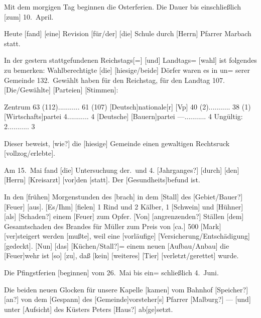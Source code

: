 

%
Mit dem morgigen Tag beginnen die Osterferien.\ob
Die Dauer bis einschließlich {[zum]} 10.\ April.

%
Heute {[fand]} {[eine]} Revision [für/der] {[die]} Schule durch {[Herrn]}\ob
Pfarrer Marbach statt.

%
In der gestern stattgefundenen Reichstags[=] {[und]} Landtags=\ob
{[wahl]}\unsicher{} ist folgendes zu bemerken:\ob
Wahlberechtigte {[die]} [hiesige/beide] Dörfer waren es in un=\ob
serer Gemeinde\unsicher{} 132.\ Gewählt haben für den Reichstag, für den Landtag 107. [Die/Gewählte] {[Parteien]} {[Stimmen]}:

\pend
{}
\pstart

Zentrum 63 (112)...........     61 (107)\ob
{[Deutsch]}nationale{[r]} {[Vp]} 40 (2)...........     38 (1)\ob
{[Wirtschafts]}partei 4...........     4\ob
{[Deutsche]} {[Bauern]}partei —...........     4\ob
Ungültig: 2...........     3

Dieser\unsicher{} beweist, [wie?] die {[hiesige]} Gemeinde\ob
einen gewaltigen Rechtsruck [vollzog/erlebte].

Am 15.\ Mai fand {[die]} Untersuchung der.\ und 4. [Jahrganges?]\unsicher{} {[durch]} {[den]} {[Herrn]} {[Kreisarzt]}\unsicher{}\unsicher\ob
{[vor]}den {[statt]}. Der {[Gesundheits]}befund ist\unsicher{}\unsicher [befriedigend?].

In den {[frühen]} Morgenstunden des\ob
{}%
{[brach]} in dem {[Stall]} des\unsicher{} [Gebiet/Bauer?]\unsicher{} {[Feuer]}\ob
{[aus]}. [Es/Ihm] {[fielen]} 1 Rind und 2 Kälber, 1 {[Schwein]} und {[Hühner]} {[als]} [Schaden?] einem\unsicher{} {[Feuer]} zum Opfer. {[Von]} [angrenzenden?]\ob
\unsicher Ställen\unsicher{}\unsicher {[mit]} {[dem]} Gesamtschaden des Brandes\ob
\unsicher\unsicher{}\unsicher für Müller zum Preis von [ca.] 500 {[Mark]}\unsicher\ob
{[ver]}steigert werden {[mußte]}, weil\unsicher{} eine {[vorläufige]} [Versicherung/Entschädigung]\ob
\unsicher {[nicht]} {[gedeckt]}\unsicher. {[Nun]} {[das]} [Küchen/Stall?]=\ob
[gebäude?]\unsicher{}\unsicher {[mit]} einem neuen [Aufbau/Anbau]\unsicher{}\unsicher\unsicher\ob
die {[Feuer]}wehr\unsicher{} ist\unsicher{} {[so]}\unsicher{} {[zu]}\unsicher, daß {[kein]} {[weiteres]}\ob
{[Tier]}\unsicher{} [verletzt/gerettet] wurde.

%
Die Pfingstferien {[beginnen]} vom 26.\ Mai bis ein=\ob
schließlich 4.\ Juni.

Die beiden neuen Glocken für unsere Kapelle\ob
{[kamen]}\unsicher{} vom Bahnhof [Speicher?] [an?] von dem\ob
{[Gespann]} des {[Gemeinde]}vorsteher{[s]}\unsicher{} Pfarrer\unsicher{} [Malburg?] — {[und]}\ob
unter {[Aufsicht]} des Küsters Peters [Haus?] ab{[ge]}setzt.
\pend
